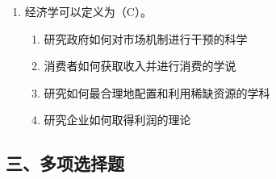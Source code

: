 \documentclass{article}
\begin{document}
\begin{enumerate}[label={\arabic*.}]
    \item 经济学可以定义为（C）。
    \begin{enumerate}[label={\Alph*.},topsep=0pt,itemsep=0pt]
        \item 研究政府如何对市场机制进行干预的科学
        \item 消费者如何获取收入并进行消费的学说
        \item 研究如何最合理地配置和利用稀缺资源的学科
        \item 研究企业如何取得利润的理论
    \end{enumerate}
\end{enumerate}

\subsection*{三、多项选择题}
\end{document}
